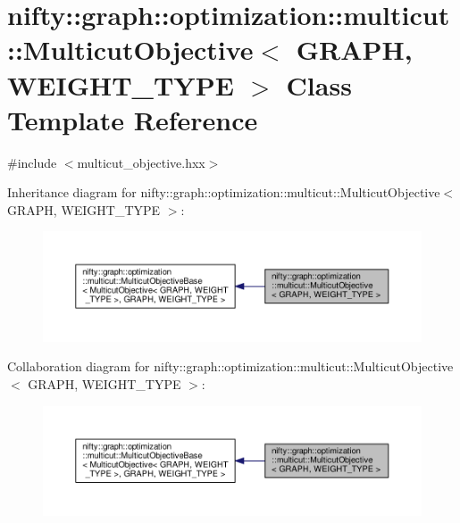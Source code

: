 \hypertarget{classnifty_1_1graph_1_1optimization_1_1multicut_1_1MulticutObjective}{}\section{nifty\+:\+:graph\+:\+:optimization\+:\+:multicut\+:\+:Multicut\+Objective$<$ G\+R\+A\+P\+H, W\+E\+I\+G\+H\+T\+\_\+\+T\+Y\+P\+E $>$ Class Template Reference}
\label{classnifty_1_1graph_1_1optimization_1_1multicut_1_1MulticutObjective}


{\ttfamily \#include $<$multicut\+\_\+objective.\+hxx$>$}



Inheritance diagram for nifty\+:\+:graph\+:\+:optimization\+:\+:multicut\+:\+:Multicut\+Objective$<$ G\+R\+A\+P\+H, W\+E\+I\+G\+H\+T\+\_\+\+T\+Y\+P\+E $>$\+:\nopagebreak
\begin{figure}[H]
\begin{center}
\leavevmode
\includegraphics[width=350pt]{classnifty_1_1graph_1_1optimization_1_1multicut_1_1MulticutObjective__inherit__graph}
\end{center}
\end{figure}


Collaboration diagram for nifty\+:\+:graph\+:\+:optimization\+:\+:multicut\+:\+:Multicut\+Objective$<$ G\+R\+A\+P\+H, W\+E\+I\+G\+H\+T\+\_\+\+T\+Y\+P\+E $>$\+:\nopagebreak
\begin{figure}[H]
\begin{center}
\leavevmode
\includegraphics[width=350pt]{classnifty_1_1graph_1_1optimization_1_1multicut_1_1MulticutObjective__coll__graph}
\end{center}
\end{figure}
